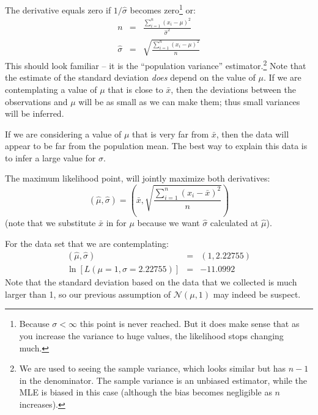 \documentclass[11pt]{article}
\begin{document}
The derivative equals zero if $1/\hat{\sigma}$ becomes zero\footnote{Because $\sigma<\infty$ this point is never reached.  But it does make sense that as you increase the variance to huge values, the likelihood stops changing much.} or:
\begin{eqnarray*}
	n & = &  \frac{\sum_{i=1}^n\left(x_i-\mu\right)^2}{\hat{\sigma}^2} \\
	\hat{\sigma} & = & \sqrt{\frac{\sum_{i=1}^n\left(x_i-\mu\right)^2}{n}}
\end{eqnarray*}
This should look familiar -- it is the ``population variance'' estimator.\footnote{We are used to seeing the sample variance, which looks similar but has $n-1$ in the denominator. The sample variance is an unbiased estimator, while the MLE is biased in this case (although the bias becomes negligible as $n$ increases).}
Note that the estimate of the standard deviation {\em does} depend on the value of $\mu$. If we are contemplating a value of $\mu$ that is close to $\bar{x}$, then the deviations between the observations and $\mu$ will be as small as we can make them; thus small variances will be inferred.  

If we are considering a value of $\mu$ that is very far from $\bar{x}$, then the data will appear to be far from the population mean. The best way to explain this data is to infer a large value for $\sigma$.

The maximum likelihood point, will jointly maximize both derivatives:
$$ (\hat\mu,\hat\sigma) = (\bar{x}, \sqrt{\frac{\sum_{i=1}^n\left(x_i-\bar{x}\right)^2}{n}})$$
(note that we substitute $\bar{x}$ in for $\mu$ because we want $\hat\sigma$ calculated at $\hat\mu$).

For the data set that we are contemplating:
\begin{eqnarray*}
	 (\hat\mu,\hat\sigma) & = & (1, 2.22755) \\
	 \ln\left[L(\mu=1, \sigma=2.22755)\right] & = & -11.0992
\end{eqnarray*}
Note that the standard deviation based on the data that we collected is much larger than 1, so our previous assumption of $\mathcal{N}(\mu,1)$ may indeed be suspect.
\end{document}
